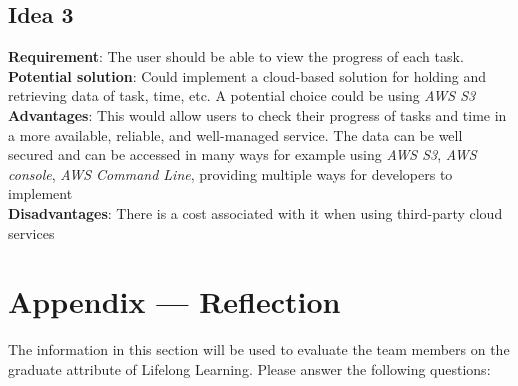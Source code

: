 \documentclass[12pt]{article}
\begin{document}
\subsection{Idea 3}
\textbf{Requirement}: The user should be able to view the progress of each task. \\
\textbf{Potential solution}: Could implement a cloud-based solution for holding and retrieving data of task, time, etc. A potential choice could be using \textit{AWS S3}\\
\textbf{Advantages}: This would allow users to check their progress of tasks and time in a more available, reliable, and well-managed service. The data can be well secured and can be accessed in many ways for example using \textit{AWS S3}, \textit{AWS console}, \textit{AWS Command Line}, providing multiple ways for developers to implement  \\
\textbf{Disadvantages}: There is a cost associated with it when using third-party cloud services
\newpage{}
\section*{Appendix --- Reflection}

The information in this section will be used to evaluate the team members on the
graduate attribute of Lifelong Learning.  Please answer the following questions:
\end{document}
